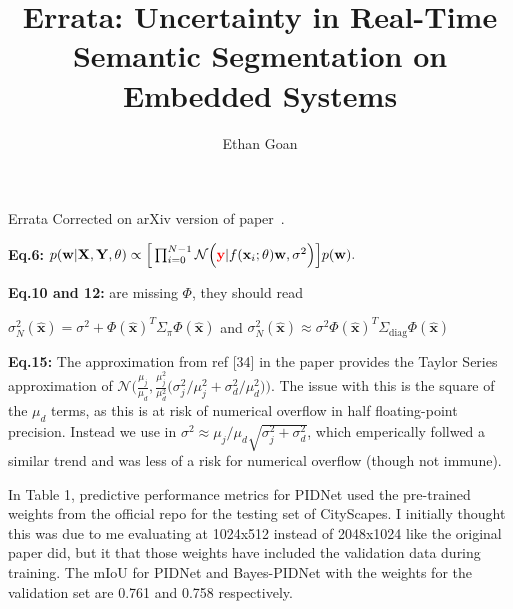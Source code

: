 \documentclass{article}
\title{{\titlefont Errata: Uncertainty in Real-Time Semantic Segmentation on Embedded Systems}}
\author{{\authorfont Ethan Goan}}
\date{} %
\begin{document}
\maketitle
\thispagestyle{fancy} %
Errata Corrected on arXiv version of paper~\cite{goan2022uncertainty}.

\textbf{Eq.6:}  $ p(\mathbf{w} | \mathbf{X}, \mathbf{Y} , \theta ) \propto \Big[\prod_{i=0}^{N-1}\mathcal{N}\Big({\color{red}\mathbf{y}}|f(\mathbf{x}_{i};\theta) \mathbf{w}, \sigma^{2}\Big)\Big] p(\mathbf{w}).$

\textbf{Eq.10 and 12:} are missing $\Phi$, they should read

$\sigma^{2}_{N}(\hat{\mathbf{x}}) =
\sigma^{2} + \Phi(\hat{\mathbf{x}})^{T}\Sigma_{\pi} \Phi(\hat{\mathbf{x}})$ and
$\sigma^{2}_{N}(\hat{\mathbf{x}}) \approx \sigma^{2} 
\Phi(\hat{\mathbf{x}})^{T}\Sigma_{\text{diag}} \Phi(\hat{\mathbf{x}})$

\textbf{Eq.15:} The approximation from ref [34] in the paper provides the Taylor Series approximation of
$ \mathcal{N}\Big(\frac{\mu_{j}}{\mu_{d}},\frac{\mu_{j}^{2}}{\mu_{d}^{2}}\big(\sigma^{2}_{j} / \mu_{j}^{2} +  \sigma^{2}_{d} / \mu_{d}^{2} \big)\Big)$. The issue with this is the square of the $\mu_{d}$ terms, as this is at risk of numerical overflow in half floating-point precision. Instead we use in $\sigma^{2} \approx \mu_{j} / \mu_{d}\sqrt{\sigma^{2}_{j} + \sigma^{2}_{d}}$, which emperically follwed a similar trend and was less of a risk for numerical overflow (though not immune).

In Table 1, predictive performance metrics for PIDNet used the pre-trained weights from the official repo for the testing set of CityScapes. I initially thought this was due to me evaluating at 1024x512 instead of 2048x1024 like the original paper did, but it that those weights have included the validation data during training. The mIoU for PIDNet and Bayes-PIDNet with the weights for the validation set are 0.761 and 0.758 respectively.



\end{document}
